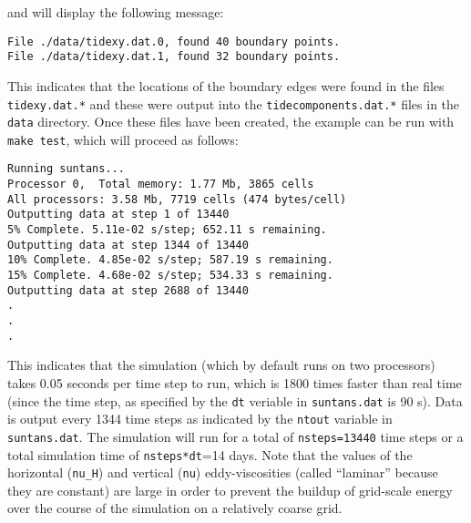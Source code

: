 and will display the following message:
\begin{verbatim}
File ./data/tidexy.dat.0, found 40 boundary points.
File ./data/tidexy.dat.1, found 32 boundary points.
\end{verbatim}
This indicates that the locations of the boundary edges were found in the files \verb+tidexy.dat.*+ and these
were output into the \verb+tidecomponents.dat.*+ files in the \verb+data+ directory.
Once these files have been created, the example can be run with \verb+make test+, which will proceed as
follows:
\begin{verbatim}
Running suntans...
Processor 0,  Total memory: 1.77 Mb, 3865 cells
All processors: 3.58 Mb, 7719 cells (474 bytes/cell)
Outputting data at step 1 of 13440
5% Complete. 5.11e-02 s/step; 652.11 s remaining.
Outputting data at step 1344 of 13440
10% Complete. 4.85e-02 s/step; 587.19 s remaining.
15% Complete. 4.68e-02 s/step; 534.33 s remaining.
Outputting data at step 2688 of 13440
.
.
.
\end{verbatim}
This indicates that the simulation (which by default runs on two processors) takes 0.05 seconds per
time step to run, which is 1800 times faster than real time (since the time step, as specified by
the \verb+dt+ veriable in \verb+suntans.dat+ is 90 s).  Data is output every 1344 time steps as
indicated by the \verb+ntout+ variable in \verb+suntans.dat+.  The simulation will run for a total
of \verb+nsteps=13440+ time steps or a total simulation time of \verb+nsteps*dt+=14 days.  Note
that the values of the horizontal (\verb+nu_H+) and vertical (\verb+nu+) eddy-viscosities (called ``laminar'' because they
are constant) are large in order to prevent the buildup of grid-scale energy over the course of
the simulation on a relatively coarse grid.


